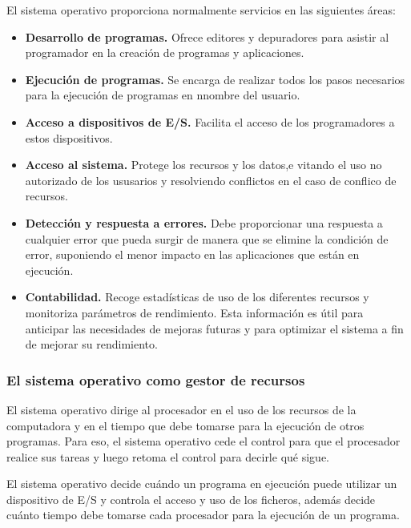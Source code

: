 \documentclass[12pt]{article}
\begin{document}
  El sistema operativo proporciona normalmente servicios en las siguientes áreas:
  \begin{itemize}
    \item \textbf{Desarrollo de programas.} Ofrece editores y depuradores para asistir al programador en la creación de programas y aplicaciones.

    \item \textbf{Ejecución de programas.} Se encarga de realizar todos los pasos necesarios para la ejecución de programas en nnombre del usuario.

    \item \textbf{Acceso a dispositivos de E/S.} Facilita el acceso de los programadores a estos dispositivos.

    \item \textbf{Acceso al sistema.} Protege los recursos y los datos,e vitando el uso no autorizado de los ususarios y resolviendo conflictos en el caso de conflico de recursos.

    \item \textbf{Detección y respuesta a errores.} Debe proporcionar una respuesta a cualquier error que pueda surgir de manera que se elimine la condición de error, suponiendo el menor impacto en las aplicaciones que están en ejecución. 

    \item \textbf{Contabilidad.} Recoge estadísticas de uso de los diferentes recursos y monitoriza parámetros de rendimiento. Esta información es útil para anticipar las necesidades de mejoras futuras y para optimizar el sistema a fin de mejorar su rendimiento.
  \end{itemize}

  \subsubsection{El sistema operativo como gestor de recursos}
  El sistema operativo dirige al procesador en el uso de los recursos de la computadora y en el tiempo que debe tomarse para la ejecución de otros programas. Para eso, el sistema operativo cede el control para que el procesador realice sus tareas y luego retoma el control para decirle qué sigue.

  El sistema operativo decide cuándo un programa en ejecución puede utilizar un dispositivo de E/S y controla el acceso y uso de los ficheros, además decide cuánto tiempo debe tomarse cada procesador para la ejecución de un programa.
\end{document}
